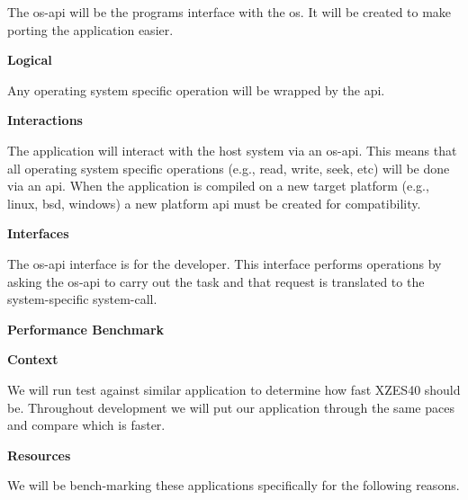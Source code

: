 The \gls{os-api} will be the programs interface with the \gls{os}.
It will be created to make porting the application easier. 

\textbf{Logical}

Any operating system specific operation will be wrapped by the \gls{api}.

\textbf{Interactions}

The application will interact with the host system via an \gls{os-api}.
This means that all operating system specific operations (e.g., read, write, seek, etc) will be done via an \gls{api}.
When the application is compiled on a new target platform (e.g., \gls{linux}, \gls{bsd}, \gls{windows}) a new platform \gls{api} must be created for compatibility.

\textbf{Interfaces}

The \gls{os-api} interface is for the developer.
This interface performs operations by asking the \gls{os-api} to carry out the task and that request is translated to the system-specific system-call. 

\textbf{Performance Benchmark}
\label{performance-benchmark}

\textbf{Context}

We will run test against similar application to determine how fast XZES40 should be.
Throughout development we will put our application through the same paces and compare which is faster.

\textbf{Resources}

We will be bench-marking these applications specifically for the following reasons.

